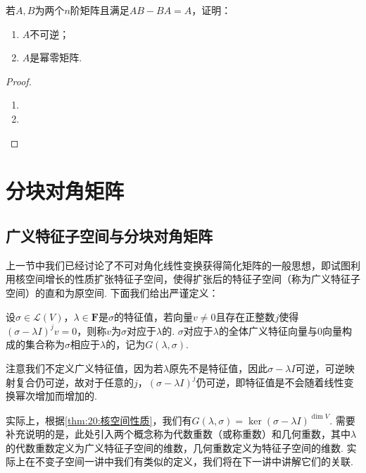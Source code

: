 \begin{example}
    若$A,B$为两个$n$阶矩阵且满足$AB-BA=A$，证明：
    \begin{enumerate}
        \item $A$不可逆；

        \item $A$是幂零矩阵.
    \end{enumerate}
\end{example}

\begin{proof}
    \begin{enumerate}
        \item

        \item
    \end{enumerate}
\end{proof}

\section{分块对角矩阵}

\subsection{广义特征子空间与分块对角矩阵}

上一节中我们已经讨论了不可对角化线性变换获得简化矩阵的一般思想，即试图利用核空间增长的性质扩张特征子空间，使得扩张后的特征子空间（称为广义特征子空间）的直和为原空间. 下面我们给出严谨定义：
\begin{definition}
    设$\sigma\in \mathcal{L}(V)$，$\lambda\in\mathbf{F}$是$\sigma$的特征值，若向量$v\neq 0$且存在正整数$j$使得$(\sigma-\lambda I)^jv=0$，则称$v$为$\sigma$对应于$\lambda$的. $\sigma$对应于$\lambda$的全体广义特征向量与0向量构成的集合称为$\sigma$相应于$\lambda$的，记为$G(\lambda,\sigma)$.
\end{definition}
注意我们不定义广义特征值，因为若$\lambda$原先不是特征值，因此$\sigma-\lambda I$可逆，可逆映射复合仍可逆，故对于任意的$j$，$(\sigma-\lambda I)^j$仍可逆，即特征值是不会随着线性变换幂次增加而增加的.

实际上，根据\autoref{thm:20:核空间性质}，我们有$G(\lambda,\sigma)=\ker (\sigma-\lambda I)^{\dim V}$. 需要补充说明的是，此处引入两个概念称为代数重数（或称重数）和几何重数，其中$\lambda$的代数重数定义为广义特征子空间的维数，几何重数定义为特征子空间的维数. 实际上在不变子空间一讲中我们有类似的定义，我们将在下一讲中讲解它们的关联.

